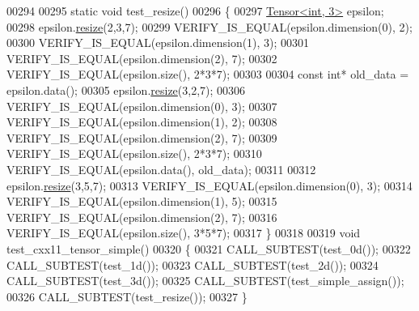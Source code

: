 \begin{DoxyCode}
00294 
00295 \textcolor{keyword}{static} \textcolor{keywordtype}{void} test\_resize()
00296 \{
00297   \hyperlink{class_eigen_1_1_tensor}{Tensor<int, 3>} epsilon;
00298   epsilon.\hyperlink{class_eigen_1_1_tensor_a5ab1ec6dc9b05d5e4db3600bc9d2cc6b}{resize}(2,3,7);
00299   VERIFY\_IS\_EQUAL(epsilon.dimension(0), 2);
00300   VERIFY\_IS\_EQUAL(epsilon.dimension(1), 3);
00301   VERIFY\_IS\_EQUAL(epsilon.dimension(2), 7);
00302   VERIFY\_IS\_EQUAL(epsilon.size(), 2*3*7);
00303 
00304   \textcolor{keyword}{const} \textcolor{keywordtype}{int}* old\_data = epsilon.data();
00305   epsilon.\hyperlink{class_eigen_1_1_tensor_a5ab1ec6dc9b05d5e4db3600bc9d2cc6b}{resize}(3,2,7);
00306   VERIFY\_IS\_EQUAL(epsilon.dimension(0), 3);
00307   VERIFY\_IS\_EQUAL(epsilon.dimension(1), 2);
00308   VERIFY\_IS\_EQUAL(epsilon.dimension(2), 7);
00309   VERIFY\_IS\_EQUAL(epsilon.size(), 2*3*7);
00310   VERIFY\_IS\_EQUAL(epsilon.data(), old\_data);
00311 
00312   epsilon.\hyperlink{class_eigen_1_1_tensor_a5ab1ec6dc9b05d5e4db3600bc9d2cc6b}{resize}(3,5,7);
00313   VERIFY\_IS\_EQUAL(epsilon.dimension(0), 3);
00314   VERIFY\_IS\_EQUAL(epsilon.dimension(1), 5);
00315   VERIFY\_IS\_EQUAL(epsilon.dimension(2), 7);
00316   VERIFY\_IS\_EQUAL(epsilon.size(), 3*5*7);
00317 \}
00318 
00319 \textcolor{keywordtype}{void} test\_cxx11\_tensor\_simple()
00320 \{
00321   CALL\_SUBTEST(test\_0d());
00322   CALL\_SUBTEST(test\_1d());
00323   CALL\_SUBTEST(test\_2d());
00324   CALL\_SUBTEST(test\_3d());
00325   CALL\_SUBTEST(test\_simple\_assign());
00326   CALL\_SUBTEST(test\_resize());
00327 \}
\end{DoxyCode}
